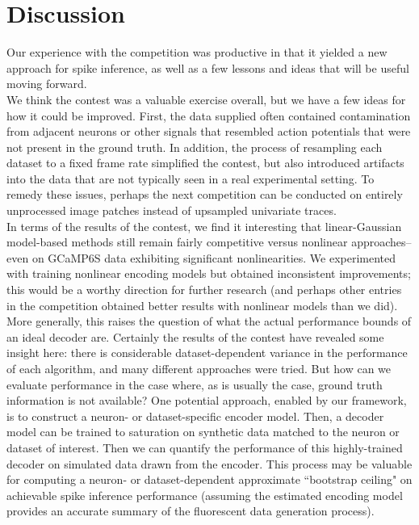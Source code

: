 \documentclass[fleqn,10pt]{wlscirep}
\begin{document}
\section{Discussion}

Our experience with the competition was productive in that it yielded a new approach for spike inference, as well as a few lessons and ideas that will be useful moving forward. \\

We think the contest was a valuable exercise overall, but we have a few ideas for how it could be improved. First, the data supplied often contained contamination from adjacent neurons or other signals that resembled action potentials that were not present in the ground truth. In addition, the process of resampling each dataset to a fixed frame rate simplified the contest, but also introduced artifacts into the data that are not typically seen in a real experimental setting. To remedy these issues, perhaps the next competition can be conducted on entirely unprocessed image patches instead of upsampled univariate traces. \\

In terms of the results of the contest, we find it interesting that linear-Gaussian model-based methods still remain fairly competitive versus nonlinear approaches--even on GCaMP6S data exhibiting significant nonlinearities. We experimented with training nonlinear encoding models but obtained inconsistent improvements; this would be a worthy direction for further research (and perhaps other entries in the competition obtained better results with nonlinear models than we did). \\

More generally, this raises the question of what the actual performance bounds of an ideal decoder are. Certainly the results of the contest have revealed some insight here: there is considerable dataset-dependent variance in the performance of each algorithm, and many different approaches were tried. But how can we evaluate performance in the case where, as is usually the case, ground truth information is not available? One potential approach, enabled by our framework, is to construct a neuron- or dataset-specific encoder model. Then, a decoder model can be trained to saturation on synthetic data matched to the neuron or dataset of interest. Then we can quantify the performance of this highly-trained decoder on simulated data drawn from the encoder. This process may be valuable for computing a neuron- or dataset-dependent approximate ``bootstrap ceiling" on achievable spike inference performance (assuming the estimated encoding model provides an accurate summary of the fluorescent data generation process).


\end{document}
